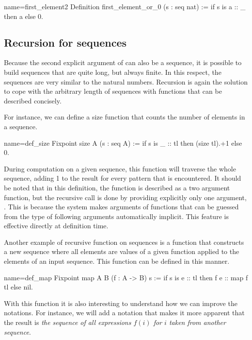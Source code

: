 \begin{coq}{name=first_element2}{}
Definition first_element_or_0 (s : seq nat) :=
  if s is a :: _ then a else 0.
\end{coq}
\subsection{Recursion for sequences}
Because the second explicit argument of  can also be a sequence, it is
possible to build sequences that are quite long, but always finite.
In this respect, the sequences are very similar to the natural
numbers.  Recursion is again the solution to cope with the arbitrary
length of sequences with functions that can be described concisely.

For instance, we can define a size function that counts the number of
elements in a sequence.

\begin{coq}{name=def_size}{}
Fixpoint size A (s : seq A) :=
  if s is _ :: tl then (size tl).+1 else 0.
\end{coq}
During computation on a given sequence, this function will traverse
the whole sequence, adding 1 to the result for every
 pattern that is encountered.  It should be noted that in this
definition, the function  is described as a two argument
function, but the recursive call  is done by providing
explicitly only one argument, .  This is because
the \Coq{} system makes
arguments of functions that can be guessed from the type of following
arguments automatically implicit.  This feature is effective directly
at definition time.

Another example of recursive function on sequences is a function that constructs
a new sequence where all elements are values of a given function applied to
the elements of an input sequence.  This function can be defined in this
manner.

\begin{coq}{name=def_map}{}
Fixpoint map A B (f : A -> B) s :=
  if s is e :: tl then f e :: map f tl else nil.
\end{coq}
With this function it is also interesting to understand how we can
improve the notations.  For instance, we will add a notation that
makes it more apparent that the result is {\em the sequence of all
expressions \(f(i)\) for \(i\) taken from another sequence}.

